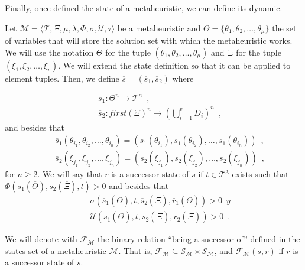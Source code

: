 Finally, once defined the state of a metaheuristic, we can define its dynamic.

\begin{definition}
	Let $\mathcal{M} = \langle \mathcal{T}, \Xi, \mu, \lambda, \Phi, \sigma, \mathcal{U}, \tau \rangle$ be a metaheuristic and $\Theta = \{ \theta_1, \theta_2, \ldots, \theta_\mu\}$ the set of variables that will store the solution set with which the metaheuristic works. We will use the notation $\overline{\Theta}$ for the tuple $(\theta_1, \theta_2, \ldots,	\theta_\mu)$ and $\overline{\Xi}$ for the tuple $(\xi_1, \xi_2, \ldots, \xi_v)$. We will extend the state definition so that it can be applied to element tuples. Then, we define $\overline{s}=(\overline{s}_1,\overline{s}_2)$ where

	\begin{eqnarray}
	& & \overline{s}_1: \Theta^n \rightarrow \mathcal{T}^n \enspace ,\\
	& & \overline{s}_2: first(\Xi)^n \rightarrow \left(\bigcup\limits_{i=1}^{v} D_i\right)^n \enspace ,
	\end{eqnarray}
	and besides that
	\begin{eqnarray}
	& & \overline{s}_1(\theta_{i_1},\theta_{i_2}, \ldots, \theta_{i_n}) = (s_1(\theta_{i_1}), s_1(\theta_{i_2}), \ldots, s_1(\theta_{i_n})) \enspace , \\
	& & \overline{s}_2(\xi_{j_1},\xi_{j_2}, \ldots, \xi_{j_n}) = (s_2(\xi_{j_1}), s_2(\xi_{j_2}), \ldots, s_2(\xi_{j_n}))
	\enspace ,
	\end{eqnarray}
	for $n\geq 2$. We will say that $r$ is a successor state of $s$ if $t \in \mathcal{T}^\lambda$ exists such that
	$\Phi(\overline{s}_1(\overline{\Theta}), \overline{s}_2(\overline{\Xi}), t) > 0$ and besides that
	\begin{eqnarray}
	& & \sigma(\overline{s}_1(\overline{\Theta}), t, \overline{s}_2(\overline{\Xi}), \overline{r}_1(\overline{\Theta})) > 0 \enspace y\\
	& & \mathcal{U}(\overline{s}_1(\overline{\Theta}), t, \overline{s}_2(\overline{\Xi}), \overline{r}_2(\overline{\Xi})) >
	0 \enspace .
	\end{eqnarray}
	
	We will denote with $\mathcal{F}_\mathcal{M}$ the binary relation ``being a successor of'' defined in the states set of a metaheuristic $\mathcal{M}$. That is, $\mathcal{F}_\mathcal{M} \subseteq \mathcal{S}_\mathcal{M} \times
	\mathcal{S}_\mathcal{M}$, and $\mathcal{F}_\mathcal{M}(s,r)$ if $r$ is a successor state of $s$.
\end{definition}

